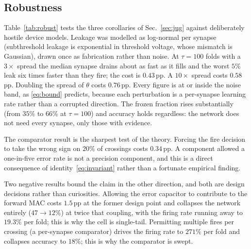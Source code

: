 \documentclass[11pt]{article}
\begin{document}
\subsection{Robustness}

Table~\ref{tab:robust} tests the three corollaries of Sec.~\ref{sec:jug} against deliberately hostile
device models. Leakage was modelled as log-normal per synapse (subthreshold leakage is exponential in
threshold voltage, whose mismatch is Gaussian), drawn once as fabrication rather than noise. At
$\tau = 100$ folds with a $3\times$ spread the median synapse drains about as fast as it fills and the
worst $5\%$ leak six times faster than they fire; the cost is $0.43$\,pp. A $10\times$ spread costs
$0.58$\,pp. Doubling the spread of $\theta$ costs $0.76$\,pp. Every figure is at or inside the noise
band, as \eqref{eq:bound} predicts, because each perturbation is a per-synapse learning rate rather
than a corrupted direction. The frozen fraction rises substantially (from $35\%$ to $66\%$ at
$\tau=100$) and accuracy holds regardless: the network does not need every synapse, only those with
evidence.

The comparator result is the sharpest test of the theory. Forcing the fire decision to take the wrong
sign on $20\%$ of crossings costs $0.34$\,pp. A component allowed a one-in-five error rate is not a
precision component, and this is a direct consequence of identity~\eqref{eq:invariant} rather than a
fortunate empirical finding.

Two negative results bound the claim in the other direction, and both are design decisions rather than
curiosities. Allowing the error capacitor to contribute to the forward MAC costs $1.5$\,pp at the
former design point and collapses the network entirely ($47 \to 12\%$) at twice that coupling, with
the firing rate running away to $19.3\%$ per fold; this is why the cell is single-tail. Permitting
multiple fires per crossing (a per-synapse comparator) drives the firing rate to $271\%$ per fold and
collapses accuracy to $18\%$; this is why the comparator is swept.
\end{document}
